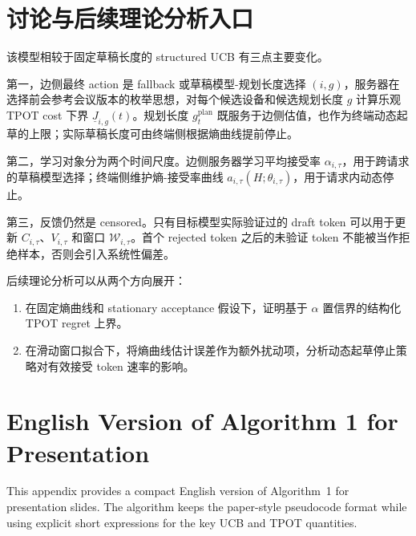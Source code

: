 \documentclass[11pt,a4paper]{ctexart}
\begin{document}
\section{讨论与后续理论分析入口}
\label{sec:discussion}

该模型相较于固定草稿长度的 structured UCB 有三点主要变化。

第一，边侧最终 action 是 fallback 或草稿模型-规划长度选择 $(i,g)$，服务器在选择前会参考会议版本的枚举思想，对每个候选设备和候选规划长度 $g$ 计算乐观 TPOT cost 下界 $\underline{J}_{i,g}(t)$。规划长度 $g_t^{\mathrm{plan}}$ 既服务于边侧估值，也作为终端动态起草的上限；实际草稿长度可由终端侧根据熵曲线提前停止。

第二，学习对象分为两个时间尺度。边侧服务器学习平均接受率 $\alpha_{i,\tau}$，用于跨请求的草稿模型选择；终端侧维护熵-接受率曲线 $a_{i,\tau}(H;\theta_{i,\tau})$，用于请求内动态停止。

第三，反馈仍然是 censored。只有目标模型实际验证过的 draft token 可以用于更新 $C_{i,\tau}$、$V_{i,\tau}$ 和窗口 $\mathcal{W}_{i,\tau}$。首个 rejected token 之后的未验证 token 不能被当作拒绝样本，否则会引入系统性偏差。

后续理论分析可以从两个方向展开：
\begin{enumerate}[leftmargin=*]
    \item 在固定熵曲线和 stationary acceptance 假设下，证明基于 $\alpha$ 置信界的结构化 TPOT regret 上界。
    \item 在滑动窗口拟合下，将熵曲线估计误差作为额外扰动项，分析动态起草停止策略对有效接受 token 速率的影响。
\end{enumerate}

\appendix
\section{English Version of Algorithm 1 for Presentation}
\label{app:english_algorithm}

This appendix provides a compact English version of Algorithm~1 for presentation slides. The algorithm keeps the paper-style pseudocode format while using explicit short expressions for the key UCB and TPOT quantities.
\end{document}
